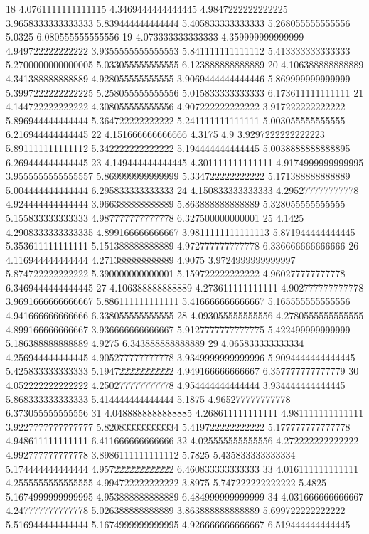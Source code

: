 18 4.0761111111111115 4.3469444444444445 4.9847222222222225 3.9658333333333333 5.839444444444444 5.405833333333333 5.268055555555556 5.0325 6.080555555555556
19 4.073333333333333 4.359999999999999 4.949722222222222 3.9355555555555553 5.841111111111112 5.413333333333333 5.2700000000000005 5.033055555555555 6.123888888888889
20 4.106388888888889 4.341388888888889 4.928055555555555 3.9069444444444446 5.869999999999999 5.3997222222222225 5.258055555555556 5.015833333333333 6.173611111111111
21 4.144722222222222 4.308055555555556 4.907222222222222 3.917222222222222 5.896944444444444 5.364722222222222 5.241111111111111 5.003055555555555 6.216944444444445
22 4.151666666666666 4.3175 4.9 3.9297222222222223 5.891111111111112 5.342222222222222 5.194444444444445 5.0038888888888895 6.269444444444445
23 4.149444444444445 4.301111111111111 4.9174999999999995 3.9555555555555557 5.869999999999999 5.334722222222222 5.171388888888889 5.004444444444444 6.295833333333333
24 4.150833333333333 4.295277777777778 4.924444444444444 3.966388888888889 5.863888888888889 5.328055555555555 5.155833333333333 4.987777777777778 6.327500000000001
25 4.1425 4.2908333333333335 4.899166666666667 3.9811111111111113 5.871944444444445 5.353611111111111 5.151388888888889 4.972777777777778 6.336666666666666
26 4.116944444444444 4.271388888888889 4.9075 3.9724999999999997 5.874722222222222 5.390000000000001 5.159722222222222 4.960277777777778 6.3469444444444445
27 4.106388888888889 4.273611111111111 4.902777777777778 3.9691666666666667 5.886111111111111 5.416666666666667 5.165555555555556 4.941666666666666 6.338055555555555
28 4.093055555555556 4.2780555555555555 4.899166666666667 3.936666666666667 5.9127777777777775 5.422499999999999 5.186388888888889 4.9275 6.343888888888889
29 4.065833333333334 4.256944444444445 4.905277777777778 3.9349999999999996 5.9094444444444445 5.425833333333333 5.194722222222222 4.949166666666667 6.357777777777779
30 4.052222222222222 4.250277777777778 4.954444444444444 3.934444444444445 5.868333333333333 5.414444444444444 5.1875 4.965277777777778 6.373055555555556
31 4.0488888888888885 4.268611111111111 4.981111111111111 3.9227777777777777 5.820833333333334 5.419722222222222 5.177777777777778 4.948611111111111 6.411666666666666
32 4.025555555555556 4.272222222222222 4.992777777777778 3.8986111111111112 5.7825 5.435833333333334 5.174444444444444 4.957222222222222 6.460833333333333
33 4.016111111111111 4.2555555555555555 4.994722222222222 3.8975 5.747222222222222 5.4825 5.1674999999999995 4.953888888888889 6.484999999999999
34 4.031666666666667 4.247777777777778 5.026388888888889 3.863888888888889 5.699722222222222 5.516944444444444 5.1674999999999995 4.926666666666667 6.519444444444445

